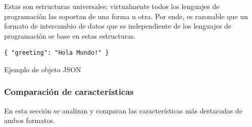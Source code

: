 Estas son estructuras universales; virtualmente todos los lenguajes de programación las soportan de una forma u otra. Por ende, es razonable que un formato de intercambio de datos que es independiente de los lenguajes de programación se base en estas estructuras.

\begin{verbatim}
{ "greeting": "Hola Mundo!" } 
\end{verbatim}
\begin{center}
\caption{Ejemplo de objeto JSON}
\end{center}

\subsubsection{Comparación de características}
En esta sección se analizan y comparan las características más destacadas de ambos formatos.


